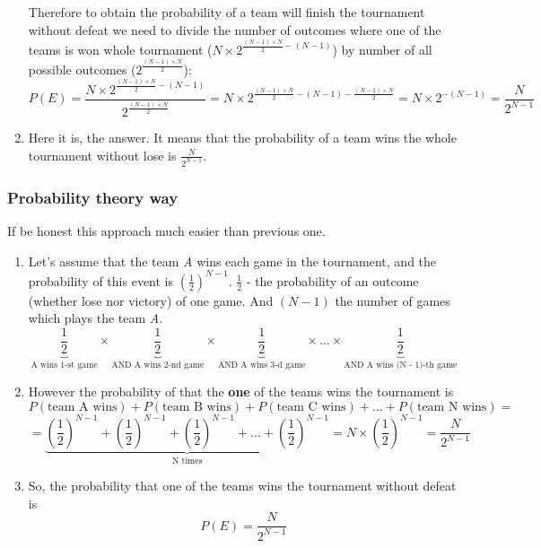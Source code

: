 \documentclass[14pt, a4paper]{extarticle}
\begin{document}
\begin{enumerate}

    Therefore to obtain the probability of a team will finish the tournament without defeat we need to divide the number of outcomes where one of the teams is won whole tournament (\(N \times 2^{\frac{(N - 1) \times N}{2} - (N - 1)}\)) by number of all possible outcomes (\(2^{\frac{(N - 1) \times N}{2}}\)):
    \[
        P (E) =
        \frac{N \times 2^{\frac{(N - 1) \times N}{2} - (N - 1)}}{2^{\frac{(N - 1) \times N}{2}}} =
        N \times 2^{\frac{(N - 1) \times N}{2} - (N - 1) - \frac{(N - 1) \times N}{2}} =
        N \times 2^{-(N - 1)} = \frac{N}{2^{N-1}}
    \]
    \item Here it is, the answer. It means that the probability of a team wins the whole tournament
    without lose is \(\frac{N}{2^{N-1}}\).
\end{enumerate}

\subsubsection*{Probability theory way}
If be honest this approach much easier than previous one. 

\begin{enumerate}
    \item Let's assume that the team \emph{A} wins each game in the tournament, and the 
    probability of this event is \((\frac{1}{2})^{N-1}\). \(\frac{1}{2}\) - the probability of an outcome (whether lose nor victory) of one game.
    And \((N - 1)\) the number of games which plays the team \emph{A}.
    \[
        \underbrace{\frac{1}{2}}_\text{A wins 1-st game} 
        \times \underbrace{\frac{1}{2}}_\text{AND A wins 2-nd game} 
        \times \underbrace{\frac{1}{2}}_\text{AND A wins 3-d game} 
        \times \dots
        \times \underbrace{\frac{1}{2}}_\text{AND A wins (N - 1)-th game}
    \]
    \item However the probability of that the \textbf{one} of the teams wins the tournament is
    \[
        P(\text{team A wins}) + P(\text{team B wins}) + P(\text{team C wins})
        + \dots + P(\text{team N wins}) = 
    \]
    \[
        = \underbrace{\left( \frac{1}{2} \right)^{N-1} 
        + \left( \frac{1}{2} \right)^{N-1} 
        + \left( \frac{1}{2} \right)^{N-1} + \dots 
        + \left( \frac{1}{2} \right)^{N-1}}_\text{N times} = N \times \left( \frac{1}{2} \right)^{N-1} = \frac{N}{2^{N-1}}
    \]
    \item So, the probability that one of the teams wins the tournament without defeat is 
    \[
        P(E) = \frac{N}{2^{N-1}}
    \]
\end{enumerate}
\end{document}
